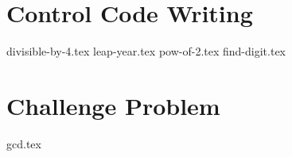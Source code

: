 \documentclass{exam}
\begin{document}
\section{Control Code Writing}
\begin{questions}
{divisible-by-4.tex}
{leap-year.tex}
{pow-of-2.tex}
{find-digit.tex}
\end{questions}

\newpage
\section{Challenge Problem}
\begin{questions}
{gcd.tex}
\end{questions}
\end{document}
